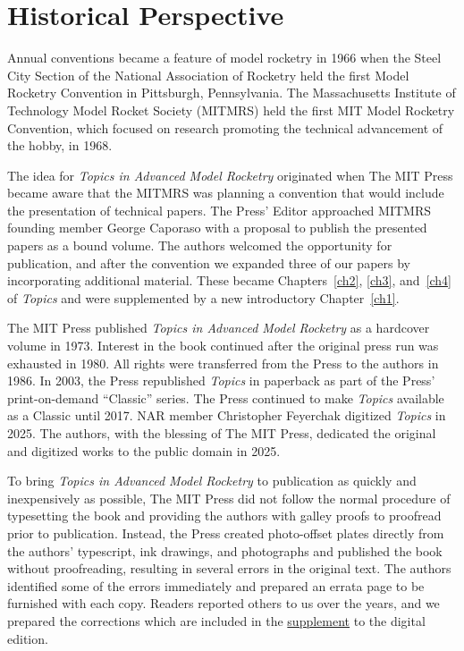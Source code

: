 \chapter{Historical Perspective}\label{front:historical}

Annual conventions became a feature of model rocketry in 1966 when the Steel City Section of the
National Association of Rocketry held the first Model Rocketry Convention in Pittsburgh,
Pennsylvania. The Massachusetts Institute of Technology Model Rocket Society (MITMRS) held the first
MIT Model Rocketry Convention, which focused on research promoting the technical advancement of the
hobby, in 1968.

The idea for \emph{Topics in Advanced Model Rocketry} originated when The MIT Press became aware that
the MITMRS was planning a convention that would include the presentation of technical papers. The
Press' Editor approached MITMRS founding member George Caporaso with a proposal to publish the
presented papers as a bound volume. The authors welcomed the opportunity for publication, and after
the convention we expanded three of our papers by incorporating additional material. These became
Chapters~\ref{ch2}, \ref{ch3}, and~\ref{ch4} of \emph{Topics} and were supplemented by a new
introductory Chapter~\ref{ch1}.

The MIT Press published \emph{Topics in Advanced Model Rocketry} as a hardcover volume in 1973.
Interest in the book continued after the original press run was exhausted in 1980. All rights were
transferred from the Press to the authors in 1986. In 2003, the Press republished \emph{Topics} in
paperback as part of the Press' print-on-demand ``Classic'' series. The Press continued to make
\emph{Topics} available as a Classic until 2017. NAR member Christopher Feyerchak digitized
\emph{Topics} in 2025. The authors, with the blessing of The MIT Press, dedicated the original and
digitized works to the public domain in 2025.

To bring \emph{Topics in Advanced Model Rocketry} to publication as quickly and inexpensively as
possible, The MIT Press did not follow the normal procedure of typesetting the book and providing the
authors with galley proofs to proofread prior to publication. Instead, the Press created photo-offset
plates directly from the authors' typescript, ink drawings, and photographs and published the book
without proofreading, resulting in several errors in the original text. The authors identified some
of the errors immediately and prepared an errata page to be furnished with each copy. Readers
reported others to us over the years, and we prepared the corrections which are included in the
\hyperref[supp]{supplement} to the digital edition.

